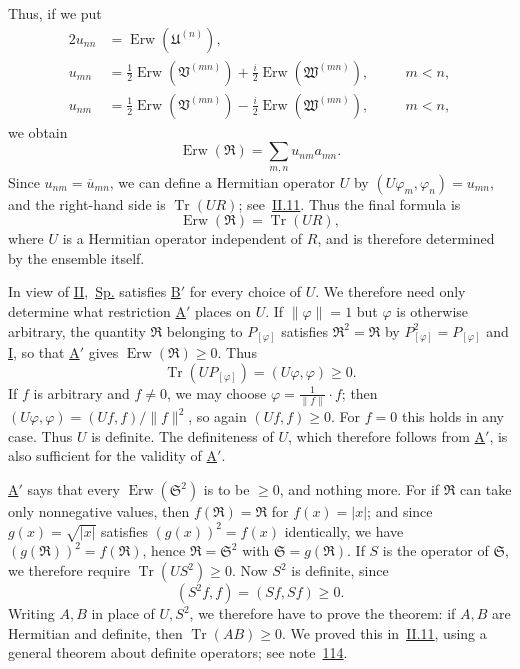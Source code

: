 \documentclass[fontsize=13pt,twoside,openany,headings=normal,parskip=false,bookmarkpackage=false,DIV=calc]{scrbook}
\begin{document}
\hypertarget{origpage-168}{}%
Thus, if we put
\begin{alignat*}{2}
u_{nn}&=\operatorname{Erw}(\mathfrak U^{(n)}),\\
u_{mn}&=\tfrac12\operatorname{Erw}(\mathfrak V^{(mn)})+\tfrac i2\operatorname{Erw}(\mathfrak W^{(mn)}),&\quad &m<n,\\
u_{nm}&=\tfrac12\operatorname{Erw}(\mathfrak V^{(mn)})-\tfrac i2\operatorname{Erw}(\mathfrak W^{(mn)}),&\quad &m<n,
\end{alignat*}
we obtain
\[
\operatorname{Erw}(\mathfrak R)=\sum_{m,n}u_{nm}a_{mn}.
\]
Since $u_{nm}=\overline{u}_{mn}$, we can define a Hermitian operator $U$ by $(U\varphi_m,\varphi_n)=u_{mn}$, and the right-hand side is $\operatorname{Tr}(UR)$; see~\hyperref[sec:II.11]{II.11}. Thus the final formula is
\begin{equation}\tag{Sp.}\label{eq:IV.2.Sp}
\operatorname{Erw}(\mathfrak R)=\operatorname{Tr}(UR),
\end{equation}
where $U$ is a Hermitian operator independent of $R$, and is therefore determined by the ensemble itself.

In view of \hyperref[cond:IV.2.II]{II},~\hyperref[eq:IV.2.Sp]{Sp.} satisfies \hyperref[cond:IV.Bprime]{B$'$} for every choice of $U$. We therefore need only determine what restriction \hyperref[cond:IV.Aprime]{A$'$} places on $U$. If $\|\varphi\|=1$ but $\varphi$ is otherwise arbitrary, the quantity $\mathfrak R$ belonging to $P_{[\varphi]}$ satisfies $\mathfrak R^2=\mathfrak R$ by $P_{[\varphi]}^2=P_{[\varphi]}$ and \hyperref[cond:IV.2.I]{I}, so that \hyperref[cond:IV.Aprime]{A$'$} gives $\operatorname{Erw}(\mathfrak R)\geq0$. Thus
\[
\operatorname{Tr}(UP_{[\varphi]})=(U\varphi,\varphi)\geq0.
\]
If $f$ is arbitrary and $f\ne0$, we may choose $\varphi=\frac1{\|f\|}\cdot f$; then $(U\varphi,\varphi)=(Uf,f)/\|f\|^2$, so again $(Uf,f)\geq0$. For $f=0$ this holds in any case. Thus $U$ is definite. The definiteness of $U$, which therefore follows from \hyperref[cond:IV.Aprime]{A$'$}, is also sufficient for the validity of \hyperref[cond:IV.Aprime]{A$'$}.

\hyperref[cond:IV.Aprime]{A$'$} says that every $\operatorname{Erw}(\mathfrak S^2)$ is to be $\geq0$, and nothing more. For if $\mathfrak R$ can take only nonnegative values, then $f(\mathfrak R)=\mathfrak R$ for $f(x)=|x|$; and since $g(x)=\sqrt{|x|}$ satisfies $(g(x))^2=f(x)$ identically, we have $(g(\mathfrak R))^2=f(\mathfrak R)$, hence $\mathfrak R=\mathfrak S^2$ with $\mathfrak S=g(\mathfrak R)$. If $S$ is the operator of $\mathfrak S$, we therefore require $\operatorname{Tr}(US^2)\geq0$. Now $S^2$ is definite, since
\[
(S^2f,f)=(Sf,Sf)\geq0.
\]
Writing $A,B$ in place of $U,S^2$, we therefore have to prove the theorem: if $A,B$ are Hermitian and definite, then $\operatorname{Tr}(AB)\geq0$. We proved this in~\hyperref[sec:II.11]{II.11}, using a general theorem about definite operators; see note~\hyperlink{note-114}{114}.
\end{document}
